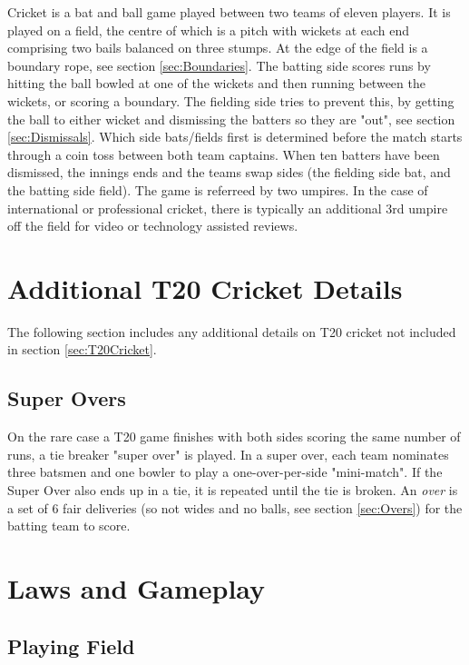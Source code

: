 \documentclass[12pt,a4paper]{report}
\theoremstyle{definition}
\begin{document}
Cricket is a bat and ball game played between two teams of eleven players. 
It is played on a field, the centre of which is a pitch with wickets at each end comprising two bails balanced on three stumps. 
At the edge of the field is a boundary rope, see section \ref{sec:Boundaries}. 
The batting side scores runs by hitting the ball bowled at one of the wickets and then running between the wickets, or scoring a boundary.
The fielding side tries to prevent this, by getting the ball to either wicket and dismissing the batters so they are "out", see section \ref{sec:Dismissals}.
Which side bats/fields first is determined before the match starts through a coin toss between both team captains.
When ten batters have been dismissed, the innings ends and the teams swap sides (the fielding side bat, and the batting side field).
The game is referreed by two umpires.
In the case of international or professional cricket, there is typically an additional 3rd umpire off the field for video or technology assisted reviews.

\section{Additional T20 Cricket Details} \label{sec:AdditionalT20Cricket}

The following section includes any additional details on T20 cricket not included in section \ref{sec:T20Cricket}.

\subsection{Super Overs}

On the rare case a T20 game finishes with both sides scoring the same number of runs, a tie breaker "super over" is played.
In a super over, each team nominates three batsmen and one bowler to play a one-over-per-side "mini-match".
If the Super Over also ends up in a tie, it is repeated until the tie is broken.
An \emph{over} is a set of 6 fair deliveries (so not wides and no balls, see section \ref{sec:Overs}) for the batting team to score.

\section{Laws and Gameplay}

\subsection{Playing Field}
\end{document}
